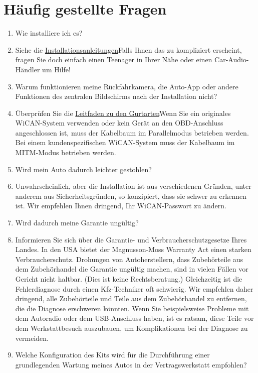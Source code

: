 \documentclass[superscriptaddress,onecolumn,floatfix]{revtex4-2}
\begin{document}
\section{Häufig gestellte Fragen}
\begin{enumerate}
  \item[Q:] Wie installiere ich es?
  \item[A:] Siehe die \href{https://github.com/tylerharvey/Ioniq5_CAN/blob/main/guides/}{Installationsanleitungen}Falls Ihnen das zu kompliziert erscheint, fragen Sie doch einfach einen Teenager in Ihrer Nähe oder einen Car-Audio-Händler um Hilfe!
  \item[Q:] Warum funktionieren meine Rückfahrkamera, die Auto-App oder andere Funktionen des zentralen Bildschirms nach der Installation nicht?
  \item[A:] Überprüfen Sie die \href{https://github.com/tylerharvey/Ioniq5_CAN/blob/main/guides/harnesses/head_unit_MITM/MITM_harness_modes.pdf}{Leitfaden zu den Gurtarten}Wenn Sie ein originales WiCAN-System verwenden oder kein Gerät an den OBD-Anschluss angeschlossen ist, muss der Kabelbaum im Parallelmodus betrieben werden. Bei einem kundenspezifischen WiCAN-System muss der Kabelbaum im MITM-Modus betrieben werden.
  \item[Q:] Wird mein Auto dadurch leichter gestohlen?
  \item[A:] Unwahrscheinlich, aber die Installation ist aus verschiedenen Gründen, unter anderem aus Sicherheitsgründen, so konzipiert, dass sie schwer zu erkennen ist. Wir empfehlen Ihnen dringend, Ihr WiCAN-Passwort zu ändern. 
  \item[Q:] Wird dadurch meine Garantie ungültig?
  \item[A:] Informieren Sie sich über die Garantie- und Verbraucherschutzgesetze Ihres Landes. In den USA bietet der Magnusson-Moss Warranty Act einen starken Verbraucherschutz. Drohungen von Autoherstellern, dass Zubehörteile aus dem Zubehörhandel die Garantie ungültig machen, sind in vielen Fällen vor Gericht nicht haltbar. (Dies ist keine Rechtsberatung.) Gleichzeitig ist die Fehlerdiagnose durch einen Kfz-Techniker oft schwierig. Wir empfehlen daher dringend, alle Zubehörteile und Teile aus dem Zubehörhandel zu entfernen, die die Diagnose erschweren könnten. Wenn Sie beispielsweise Probleme mit dem Autoradio oder dem USB-Anschluss haben, ist es ratsam, diese Teile vor dem Werkstattbesuch auszubauen, um Komplikationen bei der Diagnose zu vermeiden. 
  \item[Q:] Welche Konfiguration des Kits wird für die Durchführung einer grundlegenden Wartung meines Autos in der Vertragswerkstatt empfohlen?

\end{enumerate}
\end{document}
